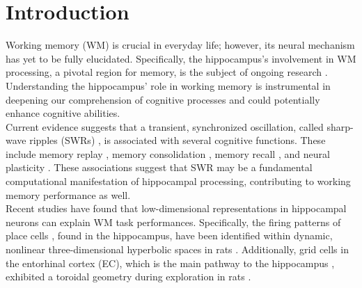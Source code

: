 \section{Introduction}
Working memory (WM) is crucial in everyday life; however, its neural mechanism has yet to be fully elucidated. Specifically, the hippocampus's involvement in WM processing, a pivotal region for memory, is the subject of ongoing research \cite{scoville_loss_1957} \cite{squire_legacy_2009}  \cite{boran_persistent_2019} \cite{kaminski_persistently_2017} \cite{kornblith_persistent_2017} \cite{faraut_dataset_2018} \cite{borders_hippocampus_2022} \cite{li_functional_2023} \cite{dimakopoulos_information_2022}. Understanding the hippocampus’ role in working memory is instrumental in deepening our comprehension of cognitive processes and could potentially enhance cognitive abilities.
\\
\indent
Current evidence suggests that a transient, synchronized oscillation, called sharp-wave ripples (SWRs) \cite{buzsaki_hippocampal_2015}, is associated with several cognitive functions. These include memory replay \cite{wilson_reactivation_1994} \cite{nadasdy_replay_1999} \cite{lee_memory_2002} \cite{diba_forward_2007} \cite{davidson_hippocampal_2009}, memory consolidation \cite{girardeau_selective_2009} \cite{ego-stengel_disruption_2010} \cite{fernandez-ruiz_long-duration_2019} \cite{kim_corticalhippocampal_2022}, memory recall \cite{wu_hippocampal_2017} \cite{norman_hippocampal_2019} \cite{norman_hippocampal_2021}, and neural plasticity \cite{behrens_induction_2005} \cite{norimoto_hippocampal_2018}. These associations suggest that SWR may be a fundamental computational manifestation of hippocampal processing, contributing to working memory performance as well.
\\
\indent
Recent studies have found that low-dimensional representations in hippocampal neurons can explain WM task performances. Specifically, the firing patterns of place cells \cite{okeefe_hippocampus_1971} \cite{okeefe_place_1976} \cite{ekstrom_cellular_2003} \cite{kjelstrup_finite_2008} \cite{harvey_intracellular_2009}, found in the hippocampus, have been identified within dynamic, nonlinear three-dimensional hyperbolic spaces in rats \cite{zhang_hippocampal_2022}. Additionally, grid cells in the entorhinal cortex (EC), which is the main pathway to the hippocampus \cite{naber_reciprocal_2001} \cite{van_strien_anatomy_2009} \cite{strange_functional_2014}, exhibited a toroidal geometry during exploration in rats \cite{gardner_toroidal_2022}.
\\
